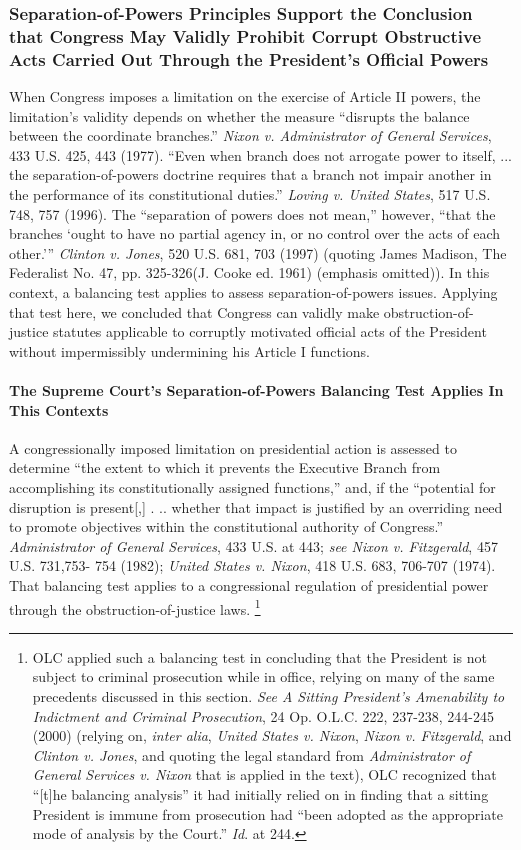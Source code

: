 \subsubsection{Separation-of-Powers Principles Support the Conclusion that Congress May Validly Prohibit Corrupt Obstructive Acts Carried Out Through the President’s Official Powers}

When Congress imposes a limitation on the exercise of Article II powers, the limitation’s validity depends on whether the measure “disrupts the balance between the coordinate branches.”
\textit{Nixon v. Administrator of General Services}, 433 U.S. 425, 443 (1977).
“Even when branch does not arrogate power to itself, ... the separation-of-powers doctrine requires that a branch not impair another in the performance of its constitutional duties.”
\textit{Loving v. United States}, 517 U.S. 748, 757 (1996).
The “separation of powers does not mean,” however, “that the branches ‘ought to have no partial agency in, or no control over the acts of each other.’”
\textit{Clinton v. Jones}, 520 U.S. 681, 703 (1997) (quoting James Madison, The Federalist No. 47, pp. 325-326(J. Cooke ed. 1961) (emphasis omitted)).
In this context, a balancing test applies to assess separation-of-powers issues.
Applying that test here, we concluded that Congress can validly make obstruction-of-justice statutes applicable to corruptly motivated official acts of the President without impermissibly undermining his Article I functions.

\paragraph{The Supreme Court’s Separation-of-Powers Balancing Test Applies In This Contexts}

A congressionally imposed limitation on presidential action is assessed to determine “the extent to which it prevents the Executive Branch from accomplishing its constitutionally assigned functions,” and, if the “potential for disruption is present[,] . .. whether that impact is justified by an overriding need to promote objectives within the constitutional authority of Congress.”
\textit{Administrator of General Services}, 433 U.S. at 443;
\textit{see Nixon v. Fitzgerald}, 457 U.S. 731,753- 754 (1982);
\textit{United States v. Nixon}, 418 U.S. 683, 706-707 (1974).
That balancing test applies to a congressional regulation of presidential power through the obstruction-of-justice laws.%
\footnote{OLC applied such a balancing test in concluding that the President is not subject to criminal prosecution while in office, relying on many of the same precedents discussed in this section.
\textit{See A Sitting President’s Amenability to Indictment and Criminal Prosecution}, 24 Op. O.L.C. 222, 237-238, 244-245 (2000) (relying on, \textit{inter alia}, \textit{United States v. Nixon}, \textit{Nixon v. Fitzgerald}, and \textit{Clinton v. Jones}, and quoting the legal standard from \textit{Administrator of General Services v. Nixon} that is applied in the text), OLC recognized that “[t]he balancing analysis” it had initially relied on in finding that a sitting President is immune from prosecution had “been adopted as the appropriate mode of analysis by the Court.”
\textit{Id}. at 244.}


